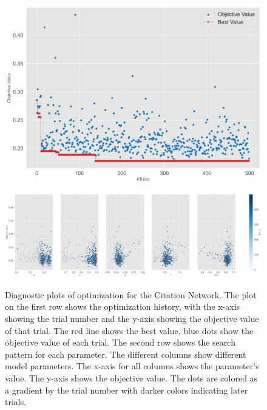 \documentclass[11pt]{article}
\begin{document}
\begin{figure}[H]
    \centering
    \includegraphics[width=.7\linewidth]{../plots/overall/Optimization_History_netscience.png}
    \includegraphics[width=.7\linewidth]{../plots/overall/Plot_Slice_netscience.png}
  \caption{Diagnostic plots of optimization for the Citation Network. The plot on the first row shows the optimization history, with the x-axis showing the trial number and the y-axis showing the objective value of that trial. The red line shows the best value, blue dots show the objective value of each trial. The second row shows the search pattern for each parameter. The different columns show different model parameters. The x-axis for all columns shows the parameter's value. The y-axis shows the objective value. The dots are colored as a gradient by the trial number with darker colors indicating later trials.}
  \label{appendix:optimization_netscience}
\end{figure}
\end{document}

